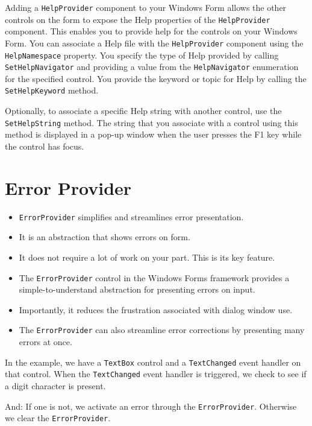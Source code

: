 Adding a \texttt{HelpProvider} component to your Windows Form allows the other controls on the form to expose the Help properties of the \texttt{HelpProvider} component. This enables you to provide help for the controls on your Windows Form. You can associate a Help file with the \texttt{HelpProvider} component using the \texttt{HelpNamespace} property. You specify the type of Help provided by calling \texttt{SetHelpNavigator} and providing a value from the \texttt{HelpNavigator} enumeration for the specified control. You provide the keyword or topic for Help by calling the \texttt{SetHelpKeyword} method.

Optionally, to associate a specific Help string with another control, use the \texttt{SetHelpString} method. The string that you associate with a control using this method is displayed in a pop-up window when the user presses the F1 key while the control has focus.

\section{Error Provider}

\begin{itemize}
	\item \texttt{ErrorProvider} simplifies and streamlines error presentation. 
	\item It is an abstraction that shows errors on form. 
	\item It does not require a lot of work on your part. This is its key feature. 
	\item The \texttt{ErrorProvider} control in the Windows Forms framework provides a simple-to-understand
	abstraction for presenting errors on input. 
	\item Importantly, it reduces the frustration associated with
	dialog window use. 
	\item The \texttt{ErrorProvider} can also streamline error corrections by presenting many
	errors at once.
\end{itemize}



In the example, we have a \texttt{TextBox} control and a \texttt{TextChanged} event handler on that control. When
the \texttt{TextChanged} event handler is triggered, we check to see if a digit character is present.

And: If one is not, we activate an error through the \texttt{ErrorProvider}. Otherwise we clear the \texttt{ErrorProvider}.

